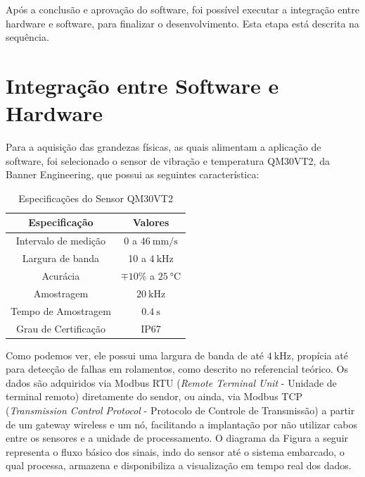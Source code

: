 Após a conclusão e aprovação do software, foi possível executar a integração entre hardware e software, para finalizar o desenvolvimento. Esta
etapa está descrita na sequência.

% 

\section{Integração entre Software e Hardware}

Para a aquisição das grandezas físicas, as quais alimentam a aplicação de software, foi selecionado o sensor de vibração e temperatura QM30VT2, 
da Banner Engineering, que possui as seguintes característica:

\begin{table}[H]
    \caption{Especificações do Sensor QM30VT2}
    \label{tab:espec_sensor}
    \centering%
    \begin{minipage}{.45\textwidth}
      \begin{tabular*}{\textwidth}{c|c}
        \hline
        Especificação            & Valores                                     \\ \hline
        \hline
        Intervalo de medição     &  0 a $\SI{46}{\milli\metre\per\second}$     \\
        Largura de banda         &  10 a $\SI{4}{\kilo\hertz}$                 \\ 
        Acurácia                 &  $\mp 10 \%$ a $\SI{25}{\celsius}$          \\
        Amostragem               &  $\SI{20}{\kilo\hertz}$                     \\
        Tempo de Amostragem      &  $\SI{0.4}{\second}$                        \\
        Grau de Certificação     &  IP67                                       \\ \hline
      \end{tabular*}
    \end{minipage}
  \end{table}

Como podemos ver, ele possui uma largura de banda de até $\SI{4}{\kilo\hertz}$, propícia até para detecção de falhas em rolamentos, como 
descrito no referencial teórico. Os dados são adquiridos via Modbus RTU (\textit{Remote Terminal Unit} - Unidade de terminal remoto) diretamente
do sendor, ou ainda, via Modbus TCP (\textit{Transmission Control Protocol} - Protocolo de Controle de Transmissão) a partir de um gateway
wireless e um nó, facilitando a implantação por não utilizar cabos entre os sensores e a unidade de processamento. O diagrama da Figura a seguir
representa o fluxo básico dos sinais, indo do sensor até o sistema embarcado, o qual processa, armazena e disponibiliza a visualização em 
tempo real dos dados. 

